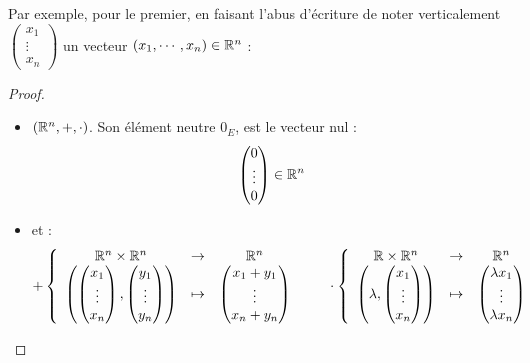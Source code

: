 	Par exemple, pour le premier, en faisant l'abus d'écriture de noter verticalement  $\begin{pmatrix} x_1 \\ \vdots \\x_n \end{pmatrix}$ un vecteur $(x_1,\cdots, x_n) \in \mathbb{R}^n$ : 
	
	
\begin{proof}
	\begin{itemize}
		\item $(\mathbb{R}^n,+, \cdot)$. Son élément neutre $0_E$, est le vecteur nul : $$\begin{pmatrix} 0 \\\vdots \\0 \end{pmatrix} \in \mathbb{R}^n$$
		\item et :
			\[ 			
				+
				\left\{ 
					\begin{array}{ccccccll}
						\mathbb{R}^n  \times \mathbb{R}^n &\to &\mathbb{R}^n \\
						\left( \begin{pmatrix} x_1 \\ \vdots \\x_n \end{pmatrix},
						\begin{pmatrix} y_1 \\ \vdots \\y_n \end{pmatrix}\right) & \mapsto &
						\begin{pmatrix} x_1 +y_1 \\ \vdots \\x_n + y_n \end{pmatrix}
					\end{array}
				\right.
				\qquad \cdot  
				\left\{ 
					\begin{array}{ccccccll}
						\mathbb{R} \times \mathbb{R}^n &\to &\mathbb{R}^n \\
						\left( \lambda, \begin{pmatrix} x_1 \\ \vdots \\x_n \end{pmatrix} \right) 	& \mapsto &
						\begin{pmatrix} \lambda x_1 \\ \vdots \\ \lambda x_n \end{pmatrix}
					\end{array}
				\right.
			\]
	\end{itemize}
\end{proof}		

